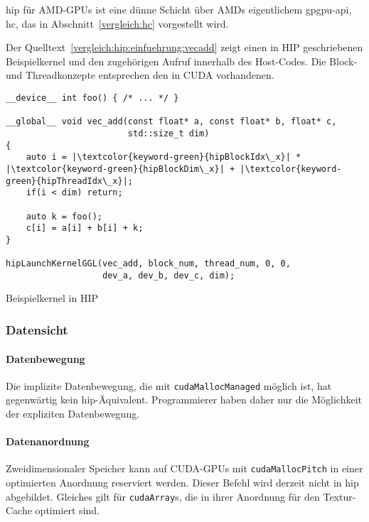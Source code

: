 \gls{hip} für AMD-GPUs ist eine dünne Schicht über AMDs eigentlichem
\gls{gpgpu}-\gls{api}, \gls{hc}, das in Abschnitt~\ref{vergleich:hc} vorgestellt
wird.

Der Quelltext~\ref{vergleich:hip:einfuehrung:vecadd} zeigt einen in HIP
geschriebenen Beispielkernel und den zugehörigen Aufruf innerhalb des
Host-Codes. Die Block- und Threadkonzepte entsprechen den in CUDA vorhandenen.

\begin{code}
    \begin{verbatim}
__device__ int foo() { /* ... */ }

__global__ void vec_add(const float* a, const float* b, float* c,
                        std::size_t dim)
{
    auto i = |\textcolor{keyword-green}{hipBlockIdx\_x}| * |\textcolor{keyword-green}{hipBlockDim\_x}| + |\textcolor{keyword-green}{hipThreadIdx\_x}|;
    if(i < dim) return;

    auto k = foo();
    c[i] = a[i] + b[i] + k;
}

hipLaunchKernelGGL(vec_add, block_num, thread_num, 0, 0,
                   dev_a, dev_b, dev_c, dim);
    \end{verbatim}
    \caption{Beispielkernel in HIP}
    \label{vergleich:hip:einfuehrung:vecadd}
\end{code}

\subsubsection{Datensicht}

\paragraph{Datenbewegung}

Die implizite Datenbewegung, die mit \texttt{cudaMallocManaged} möglich ist,
hat gegenwärtig kein \gls{hip}-Äquivalent. Programmierer haben daher nur die
Möglichkeit der expliziten Datenbewegung.

\paragraph{Datenanordnung}

Zweidimensionaler Speicher kann auf CUDA-GPUs mit \texttt{cudaMallocPitch} in
einer optimierten Anordnung reserviert werden. Dieser Befehl wird derzeit nicht
in \gls{hip} abgebildet. Gleiches gilt für \texttt{cudaArray}s, die in ihrer
Anordnung für den Textur-Cache optimiert sind.

